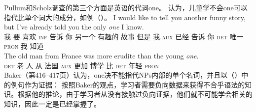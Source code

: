 Pullum和Scholz调查的第三个方面是英语的代词one。
 \citet[--425, 327--340]{Baker78a-u}认为，儿童学不会one可以指代比单个词大的成分，如例（）。
\eal
\ex 
\gll I would like to tell you another funny story, but I've already told you the only \emph{one} I
know.\\
我 要 喜欢 \textsc{inf} 告诉 你 另一个 有趣的 故事 但是 我.\textsc{aux} 已经 告诉 你 \textsc{det} 唯一 \textsc{pron} 我 知道\\
\ex 
\gll The old man from France was more erudite than the young \emph{one}.\\
\textsc{det} 老 人 从 法国 \textsc{aux} 更加 博学 比 \textsc{det} 年轻 \textsc{pron}\\
\zl
Baker（第416--417页）认为，one决不能指代NPs内部的单个名词，并且以（）中的例句作为证据：
\z
按照Baker的观点，学习者需要负向数据来获得不合乎语法的知识。根据他的推论，由于学习者从没有接触过负向证据，他们就不可能学会相关的知识，因此一定是已经掌握了。

